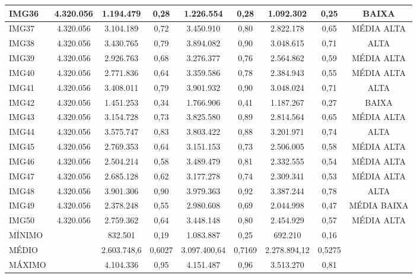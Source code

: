 \begin{table}[htbp]
\begin{tabularx}{\textwidth}{X|C|C|C|C|C|C|C|C}
        IMG36 & 4.320.056 & 1.194.479 & 0,28 & 1.226.554 & 0,28 & 1.092.302 & 0,25 & BAIXA \\ \hline
        IMG37 & 4.320.056 & 3.104.189 & 0,72 & 3.450.910 & 0,80 & 2.822.178 & 0,65 & MÉDIA ALTA \\ \hline
        IMG38 & 4.320.056 & 3.430.765 & 0,79 & 3.894.082 & 0,90 & 3.048.615 & 0,71 & ALTA \\ \hline
        IMG39 & 4.320.056 & 2.926.763 & 0,68 & 3.276.377 & 0,76 & 2.564.862 & 0,59 & MÉDIA ALTA \\ \hline
        IMG40 & 4.320.056 & 2.771.836 & 0,64 & 3.359.586 & 0,78 & 2.384.943 & 0,55 & MÉDIA ALTA \\ \hline
        IMG41 & 4.320.056 & 3.408.011 & 0,79 & 3.901.932 & 0,90 & 3.048.024 & 0,71 & ALTA \\ \hline
        IMG42 & 4.320.056 & 1.451.253 & 0,34 & 1.766.906 & 0,41 & 1.187.267 & 0,27 & BAIXA \\ \hline
        IMG43 & 4.320.056 & 3.154.728 & 0,73 & 3.825.580 & 0,89 & 2.814.564 & 0,65 & MÉDIA ALTA \\ \hline
        IMG44 & 4.320.056 & 3.575.747 & 0,83 & 3.803.422 & 0,88 & 3.201.971 & 0,74 & ALTA \\ \hline
        IMG45 & 4.320.056 & 2.769.353 & 0,64 & 3.151.153 & 0,73 & 2.506.005 & 0,58 & MÉDIA ALTA \\ \hline
        IMG46 & 4.320.056 & 2.504.214 & 0,58 & 3.489.479 & 0,81 & 2.332.555 & 0,54 & MÉDIA ALTA \\ \hline
        IMG47 & 4.320.056 & 2.685.128 & 0,62 & 3.177.278 & 0,74 & 2.309.341 & 0,53 & MÉDIA ALTA \\ \hline
        IMG48 & 4.320.056 & 3.901.306 & 0,90 & 3.979.363 & 0,92 & 3.387.244 & 0,78 & ALTA \\ \hline
        IMG49 & 4.320.056 & 2.378.248 & 0,55 & 2.980.608 & 0,69 & 2.044.998 & 0,47 & MÉDIA BAIXA \\ \hline
        IMG50 & 4.320.056 & 2.759.362 & 0,64 & 3.448.148 & 0,80 & 2.454.929 & 0,57 & MÉDIA ALTA \\ \hline
        MÍNIMO & ~ & 832.501 & 0,19 & 1.083.887 & 0,25 & 692.210 & 0,16 & ~ \\ \hline
        MÉDIO & ~ & 2.603.748,6 & 0,6027 & 3.097.400,64 & 0,7169 & 2.278.894,12 & 0,5275 & ~ \\ \hline
        MÁXIMO & ~ & 4.104.336 & 0,95 & 4.151.487 & 0,96 & 3.513.270 & 0,81 \\

    \hline
    
\end{tabularx}

\autoriaPropria

\end{table}

